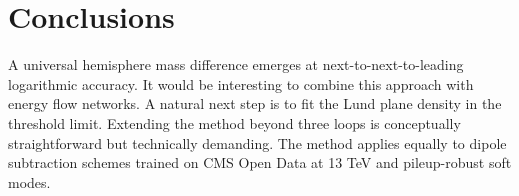 \section{Conclusions}\label{sec:conclusions}

A universal hemisphere mass difference emerges at
next-to-next-to-leading logarithmic accuracy. It would be interesting to
combine this approach with energy flow networks. A natural next step is
to fit the Lund plane density in the threshold limit. Extending the
method beyond three loops is conceptually straightforward but
technically demanding. The method applies equally to dipole subtraction
schemes trained on CMS Open Data at 13 TeV and pileup-robust soft modes.

